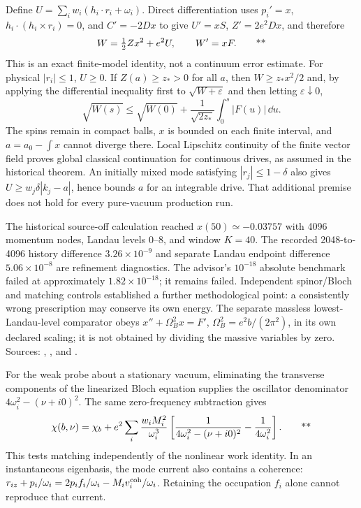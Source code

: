 Define \(U=\sum_iw_i(h_i\cdot r_i+\omega_i)\).  Direct differentiation uses
\(p_i'=x\), \(h_i\cdot(h_i\times r_i)=0\), and
\(C'=-2Dx\) to give \(U'=xS\), \(Z'=2e^2Dx\), and therefore
\begin{equation}
 W=\tfrac12 Zx^2+e^2U,
 \qquad W'=xF.\qquad\text{**}
 \label{early:work}
\end{equation}
This is an exact finite-model identity, not a continuum error estimate.
For physical \(|r_i|\le1\), \(U\ge0\).  If \(Z(a)\ge z_*>0\) for all
\(a\), then \(W\ge z_*x^2/2\) and, by applying the differential inequality
first to \(\sqrt{W+\varepsilon}\) and then letting \(\varepsilon\downarrow0\),
\begin{equation}
 \sqrt{W(s)}\le\sqrt{W(0)}+
 \frac{1}{\sqrt{2z_*}}\int_0^s|F(u)|\,\dd u.
 \label{early:existence}
\end{equation}
The spins remain in compact balls, \(x\) is bounded on each finite interval,
and \(a=a_0-\int x\) cannot diverge there.  Local Lipschitz continuity of the
finite vector field proves global classical continuation for continuous
drives, as assumed in the historical theorem.  An initially mixed
mode satisfying \(|r_j|\le1-\delta\) also gives
\(U\ge w_j\delta|k_j-a|\), hence bounds \(a\) for an integrable drive.
That additional premise does not hold for every pure-vacuum production run.

The historical source-off calculation reached \(x(50)\simeq-0.03757\) with
4096 momentum nodes, Landau levels 0--8, and window \(K=40\).  The recorded
2048-to-4096 history difference \(3.26\times10^{-9}\) and separate Landau
endpoint difference \(5.06\times10^{-8}\) are refinement diagnostics.
The advisor's \(10^{-18}\) absolute benchmark failed at approximately
\(1.82\times10^{-18}\); it remains failed.  Independent spinor/Bloch and
matching controls established a further methodological point: a consistently
wrong prescription may conserve its own energy.  The separate massless
lowest-Landau-level comparator obeys
\(x''+\Omega_B^2x=F'\), \(\Omega_B^2=e^2b/(2\pi^2)\), in its own declared
scaling; it is not obtained by dividing the massive variables by zero.
Sources: ,
, and
.

For the weak probe about a stationary vacuum, eliminating the transverse
components of the linearized Bloch equation supplies the oscillator denominator
\(4\omega_i^2-(\nu+i0)^2\).  The same zero-frequency subtraction gives
\begin{equation}
 \chi(b,\nu)=\chi_b+e^2\sum_i\frac{w_iM_i^2}{\omega_i^3}
 \left[\frac1{4\omega_i^2-(\nu+i0)^2}-\frac1{4\omega_i^2}\right].
 \qquad\text{**}\label{early:weakresponse}
\end{equation}
This tests matching independently of the nonlinear work identity.
In an instantaneous eigenbasis, the mode current also contains a coherence:
\(r_{iz}+p_i/\omega_i=2p_if_i/\omega_i-M_iv_i^{\rm coh}/\omega_i\).
Retaining the occupation \(f_i\) alone cannot reproduce that current.

